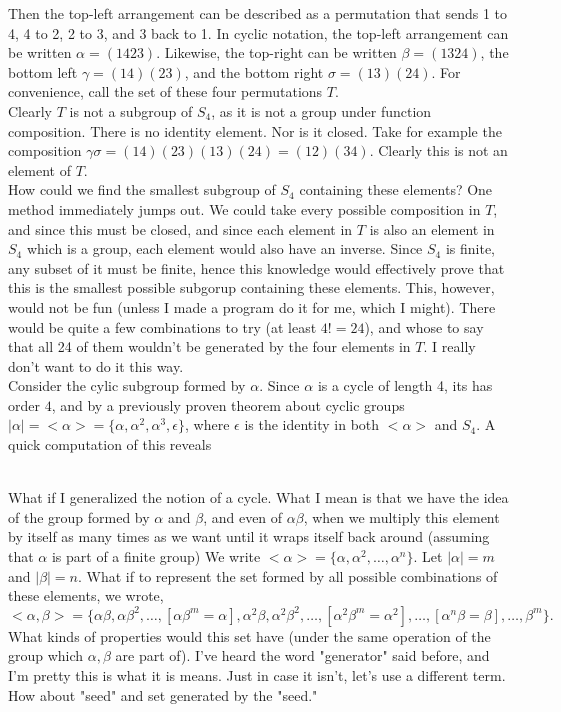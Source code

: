 \documentclass{article}
\begin{document}
Then the top-left arrangement can be described as a permutation that sends 1 to 4, 4 to 2, 2 to 3, and 3 back to 1. In cyclic notation, the top-left arrangement can be written $\alpha = (1423)$. Likewise, the top-right can be written $\beta = (1324)$, the bottom left $\gamma = (14)(23)$, and the bottom right $\sigma = (13)(24)$. For convenience, call the set of these four permutations $T$. \\

Clearly $T$ is not a subgroup of $S_4$, as it is not a group under function composition. There is no identity element. Nor is it closed. Take for example the composition $\gamma\sigma = (14)(23)(13)(24) = (12)(34)$. Clearly this is not an element of $T$. \\

How could we find the smallest subgroup of $S_4$ containing these elements? One method immediately jumps out. We could take every possible composition in $T$, and since this must be closed, and since each element in $T$ is also an element in $S_4$ which is a group, each element would also have an inverse. Since $S_4$ is finite, any subset of it must be finite, hence this knowledge would effectively prove that this is the smallest possible subgorup containing these elements. This, however, would not be fun (unless I made a program do it for me, which I might). There would be quite a few combinations to try (at least $4! = 24$), and whose to say that all 24 of them wouldn't be generated by the four elements in $T$. I really don't want to do it this way.\\
 Consider the cylic subgroup formed by $\alpha$. Since $\alpha$ is a cycle of length 4, its has order $4$, and by a previously proven theorem about cyclic groups $|\alpha| =<\alpha> = \{\alpha,\alpha^2,\alpha^3,\epsilon\}$, where $\epsilon$ is the identity in both $<\alpha>$ and $S_4$. A quick computation of this reveals 

\\

 What if I generalized the notion of a cycle. What I mean is that we have the idea of the group formed by $\alpha$ and $\beta$, and even of $\alpha\beta$, when we multiply this element by itself as many times as we want until it wraps itself back around (assuming that $\alpha$ is part of a finite group) We write $<\alpha> = \{\alpha,\alpha^2,\dots,\alpha^n\}$. Let $|\alpha| = m$ and $|\beta| = n$. What if to represent the set formed by all possible combinations of these elements, we wrote, $$<\alpha,\beta> = 
\{\alpha \beta, \alpha\beta^2, \dots,[\alpha\beta^m = \alpha],\alpha^2 \beta, \alpha^2\beta^2, \dots,[\alpha^2\beta^m = \alpha^2], \dots, [\alpha^n\beta = \beta],\dots,\beta^m\}.$$
What kinds of properties would this set have (under the same operation of the group which $\alpha,\beta$ are part of). I've heard the word "generator" said before, and I'm pretty this is what it is means. Just in case it isn't, let's use a different term. How about "seed" and set generated by the "seed."\\
\end{document}
